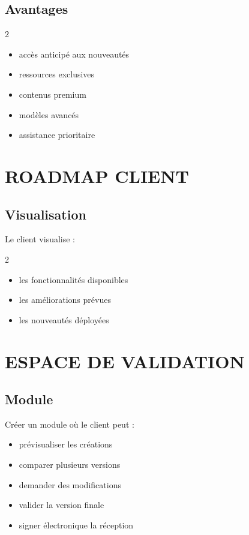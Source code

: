 \documentclass[12pt,a4paper,oneside]{book}
\begin{document}
\section{Avantages}
\begin{multicols}{2}
\begin{itemize}
\item accès anticipé aux nouveautés
\item ressources exclusives
\item contenus premium
\item modèles avancés
\item assistance prioritaire
\end{itemize}
\end{multicols}

\chapter{ROADMAP CLIENT}

\section{Visualisation}
Le client visualise :
\begin{multicols}{2}
\begin{itemize}
\item les fonctionnalités disponibles
\item les améliorations prévues
\item les nouveautés déployées
\end{itemize}
\end{multicols}

\chapter{ESPACE DE VALIDATION}

\section{Module}
Créer un module où le client peut :
\begin{itemize}
\item prévisualiser les créations
\item comparer plusieurs versions
\item demander des modifications
\item valider la version finale
\item signer électronique la réception
\end{itemize}
\end{document}
